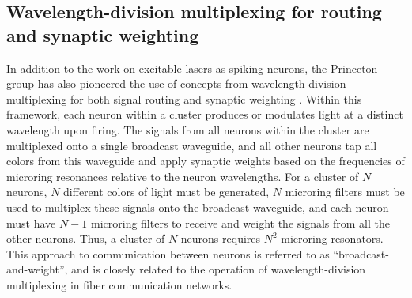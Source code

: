 \documentclass[twocolumn]{article}
\begin{document}
\subsection{Wavelength-division multiplexing for routing and synaptic weighting} 
In addition to the work on excitable lasers as spiking neurons, the Princeton group has also pioneered the use of concepts from wavelength-division multiplexing for both signal routing and synaptic weighting \cite{tana20142,tafe2017}. Within this framework, each neuron within a cluster produces or modulates light at a distinct wavelength upon firing. The signals from all neurons within the cluster are multiplexed onto a single broadcast waveguide, and all other neurons tap all colors from this waveguide and apply synaptic weights based on the frequencies of microring resonances relative to the neuron wavelengths. For a cluster of $N$ neurons, $N$ different colors of light must be generated, $N$ microring filters must be used to multiplex these signals onto the broadcast waveguide, and each neuron must have $N-1$ microring filters to receive and weight the signals from all the other neurons. Thus, a cluster of $N$ neurons requires $N^2$ microring resonators. This approach to communication between neurons is referred to as ``broadcast-and-weight'', and is closely related to the operation of wavelength-division multiplexing in fiber communication networks.
\end{document}
